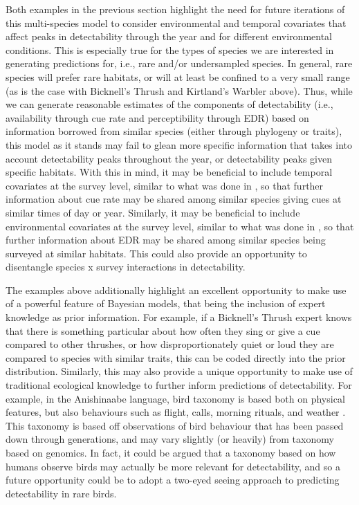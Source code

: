 \documentclass[12pt]{article}
\begin{document}
Both examples in the previous section highlight the need for future iterations of this multi-species model to consider environmental and temporal covariates that affect peaks in detectability through the year and for different environmental conditions.
This is especially true for the types of species we are interested in generating predictions for, i.e., rare and/or undersampled species.
In general, rare species will prefer rare habitats, or will at least be confined to a very small range (as is the case with Bicknell's Thrush and Kirtland's Warbler above).
Thus, while we can generate reasonable estimates of the components of detectability (i.e., availability through cue rate and perceptibility through EDR) based on information borrowed from similar species (either through phylogeny or traits), this model as it stands may fail to glean more specific information that takes into account detectability peaks throughout the year, or detectability peaks given specific habitats.
With this in mind, it may be beneficial to include temporal covariates at the survey level, similar to what was done in \citet{solymos_calibrating_2013, solymos_evaluating_2018, edwards_point_2023}, so that further information about cue rate may be shared among similar species giving cues at similar times of day or year.
Similarly, it may be beneficial to include environmental covariates at the survey level, similar to what was done in \citet{solymos_calibrating_2013, edwards_point_2023}, so that further information about EDR may be shared among similar species being surveyed at similar habitats.
This could also provide an opportunity to disentangle species x survey interactions in detectability.

\par The examples above additionally highlight an excellent opportunity to make use of a powerful feature of Bayesian models, that being the inclusion of expert knowledge as prior information.
For example, if a Bicknell's Thrush expert knows that there is something particular about how often they sing or give a cue compared to other thrushes, or how disproportionately quiet or loud they are compared to species with similar traits, this can be coded directly into the prior distribution.
Similarly, this may also provide a unique opportunity to make use of traditional ecological knowledge to further inform predictions of detectability.
For example, in the Anishinaabe language, bird taxonomy is based both on physical features, but also behaviours such as flight, calls, morning rituals, and weather \citep{pitawanakwat_evening_2022}.
This taxonomy is based off observations of bird behaviour that has been passed down through generations, and may vary slightly (or heavily) from taxonomy based on genomics.
In fact, it could be argued that a taxonomy based on how humans observe birds may actually be more relevant for detectability, and so a future opportunity could be to adopt a two-eyed seeing approach \cite{reid_twoeyed_2021} to predicting detectability in rare birds.
\end{document}
